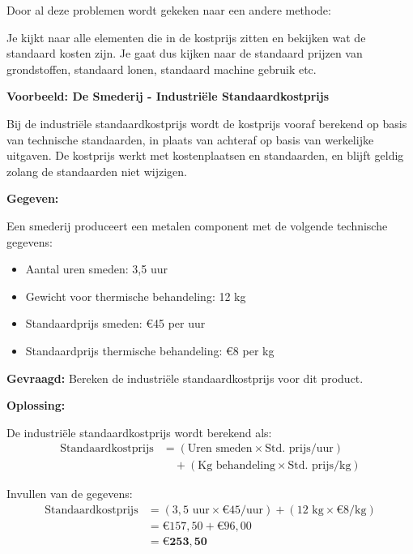 \documentclass[a4paper,11pt]{article}
\begin{document}
\begin{description}
    Door al deze problemen wordt gekeken naar een andere methode:
    \item{} Je kijkt naar 
    alle elementen die in de kostprijs zitten
    en bekijken wat de standaard kosten zijn.
    Je gaat dus kijken naar de standaard prijzen van grondstoffen,
    standaard lonen, standaard machine gebruik etc.
    \newline

    \begin{oefenblok}[title=Oefening: Industriële Standaard Kostprijsberekening]
        \textbf{Voorbeeld: De Smederij - Industriële Standaardkostprijs}
        
        Bij de industriële standaardkostprijs wordt de kostprijs vooraf berekend op basis van technische standaarden, 
        in plaats van achteraf op basis van werkelijke uitgaven. De kostprijs werkt met kostenplaatsen en standaarden, 
        en blijft geldig zolang de standaarden niet wijzigen.
        
        \textbf{Gegeven:}
        
        Een smederij produceert een metalen component met de volgende technische gegevens:
        \begin{itemize}
            \item Aantal uren smeden: 3,5 uur
            \item Gewicht voor thermische behandeling: 12 kg
            \item Standaardprijs smeden: €45 per uur
            \item Standaardprijs thermische behandeling: €8 per kg
        \end{itemize}
        
        \textbf{Gevraagd:} Bereken de industriële standaardkostprijs voor dit product.
        
        \textbf{Oplossing:}
        
        De industriële standaardkostprijs wordt berekend als:
        \begin{align*}
        \text{Standaardkostprijs} &= (\text{Uren smeden} \times \text{Std. prijs/uur}) \\
        &\quad + (\text{Kg behandeling} \times \text{Std. prijs/kg})
        \end{align*}
        
        Invullen van de gegevens:
        \begin{align*}
        \text{Standaardkostprijs} &= (3,5 \text{ uur} \times €45/\text{uur}) + (12 \text{ kg} \times €8/\text{kg}) \\
        &= €157,50 + €96,00 \\
        &= \mathbf{€253,50}
        \end{align*}
        

\end{oefenblok}
\end{description}
\end{document}
